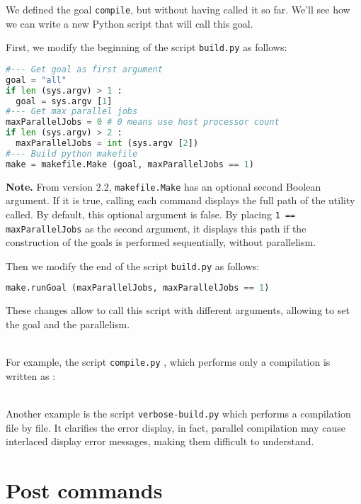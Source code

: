 \documentclass[a4paper,11pt]{extarticle}
\begin{document}
We defined the goal \texttt{compile}, but without having called it so far. We'll see how we can write a new Python script that will call this goal.

First, we modify the beginning of the script \texttt{build.py}  as follows:
\begin{lstlisting}[language=py]
#--- Get goal as first argument
goal = "all"
if len (sys.argv) > 1 :
  goal = sys.argv [1]
#--- Get max parallel jobs
maxParallelJobs = 0 # 0 means use host processor count
if len (sys.argv) > 2 :
  maxParallelJobs = int (sys.argv [2])
#--- Build python makefile
make = makefile.Make (goal, maxParallelJobs == 1)
\end{lstlisting}

{\bf Note.}\label{logUtilityToolPath2} From version 2.2, \texttt{makefile.Make}  has an optional second Boolean argument. If it is true, calling each command displays the full path of the utility called. By default, this optional argument is false. By placing \texttt{1 == maxParallelJobs} as the second argument, it displays this path if the construction of the goals is performed sequentially, without parallelism.

Then we modify the end of the script \texttt{build.py}  as follows:
\begin{lstlisting}[language=py]
make.runGoal (maxParallelJobs, maxParallelJobs == 1)
\end{lstlisting}

These changes allow to call this script with different arguments, allowing to set the goal and the parallelism.

~\\For example, the script \texttt{compile.py} , which performs only a compilation is written as :



~\\Another example is the script \texttt{verbose-build.py}  which performs a compilation file by file. It clarifies the error display, in fact, parallel compilation may cause interlaced display error messages, making them difficult to understand.








\section{Post commands}
\end{document}

